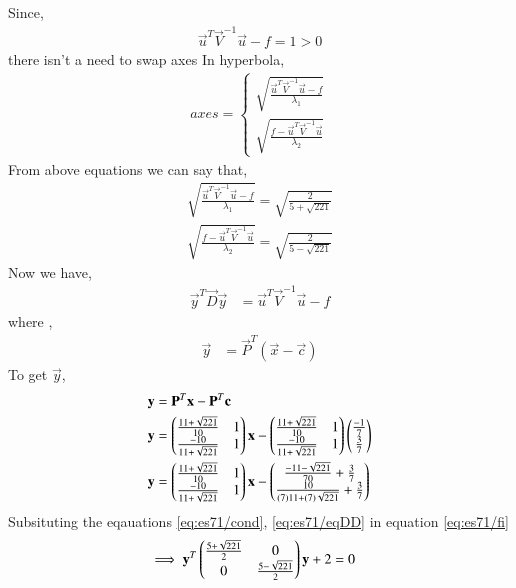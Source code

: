 \documentclass[journal,12pt,twocolumn]{IEEEtran}
\begin{document}
Since,
\begin{align}
    \vec{u}^T\vec{V}^{-1}\vec{u}-f = 1 > 0\label{eq:es71/cond}
\end{align} 
there isn't a need to swap axes
In hyperbola,
\begin{align}
axes=
\begin{cases}
\sqrt{\frac{\vec{u}^T\vec{V}^{-1}\vec{u}-f}{\lambda_1}}\\ \sqrt{\frac{f-\vec{u}^T\vec{V}^{-1}\vec{u}}{\lambda_2}}
\end{cases}
\end{align}
From above equations we can say that,
\begin{align}
\sqrt{\frac{\vec{u}^T\vec{V}^{-1}\vec{u}-f}{\lambda_1}}=\sqrt{ \frac{2}{5+\sqrt{221}}}\\
\sqrt{\frac{f-\vec{u}^T\vec{V}^{-1}\vec{u}}{\lambda_2}}=\sqrt{ \frac{2}{5-\sqrt{221}}}
\end{align}
Now we have,
\begin{align}
    \vec{y}^T\vec{D}\vec{y}&=\vec{u}^T\vec{V}^{-1}\vec{u}-f\label{eq:es71/fi}
\end{align}
where ,
\begin{align}
    \vec{y}&=\vec{P}^T(\vec{x}-\vec{c})
\end{align}
To get $\vec{y}$,
\begin{align}
\mathbf{y}&=\mathbf{P}^T\mathbf{x}-\mathbf{P}^T\mathbf{c}\\
    \mathbf{y}&= \begin{pmatrix}\frac{11+\sqrt{221}}{10} & 1 \\ \frac{-10}{11+\sqrt{221}} & 1\end{pmatrix}\mathbf{x}-\begin{pmatrix}\frac{11+\sqrt{221}}{10} & 1 \\ \frac{-10}{11+\sqrt{221}} & 1\end{pmatrix}\begin{pmatrix}\frac{-1}{7}\\\frac{3}{7}\end{pmatrix}\\
    \mathbf{y}&=\begin{pmatrix}\frac{11+\sqrt{221}}{10} & 1 \\ \frac{-10}{11+\sqrt{221}} & 1\end{pmatrix}\mathbf{x}-\begin{pmatrix}\frac{-11-\sqrt{221}}{70}+\frac{3}{7} \\ \frac{10}{(7)11+(7)\sqrt{221}}+\frac{3}{7}\end{pmatrix}
\end{align}
Subsituting the eqauations \eqref{eq:es71/cond}, \eqref{eq:es71/eqDD} in equation \eqref{eq:es71/fi}
\begin{align}
   \implies\mathbf{y}^T\begin{pmatrix}\frac{5+\sqrt{221}}{2} & 0 \\0 & \frac{5-\sqrt{221}}{2}\end{pmatrix}\mathbf{y}+2&=0
\end{align}
\end{document}
